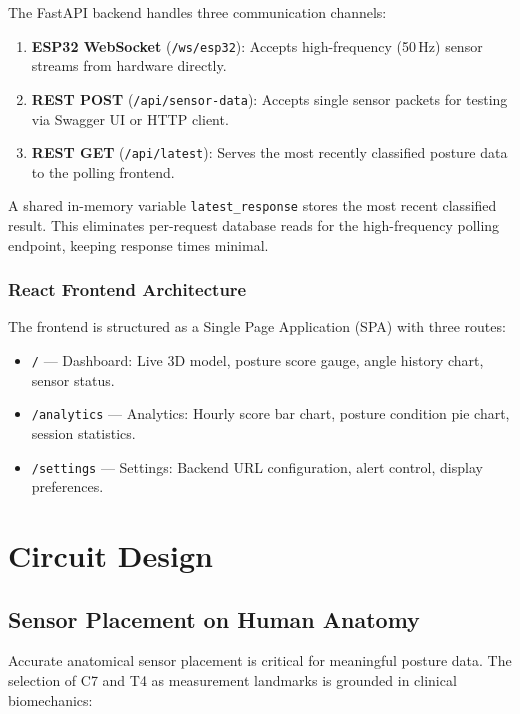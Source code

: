 \documentclass[12pt,a4paper]{report}
\newcommand{\code}[1]{\texttt{\small\color{accentviolet}#1}}
\begin{document}
The FastAPI backend handles three communication channels:
\begin{enumerate}[leftmargin=2em]
    \item \textbf{ESP32 WebSocket} (\code{/ws/esp32}): Accepts high-frequency (50\,Hz) sensor streams from hardware directly.
    \item \textbf{REST POST} (\code{/api/sensor-data}): Accepts single sensor packets for testing via Swagger UI or HTTP client.
    \item \textbf{REST GET} (\code{/api/latest}): Serves the most recently classified posture data to the polling frontend.
\end{enumerate}

A shared in-memory variable \code{latest\_response} stores the most recent classified result. This eliminates per-request database reads for the high-frequency polling endpoint, keeping response times minimal.

\subsection{React Frontend Architecture}

The frontend is structured as a Single Page Application (SPA) with three routes:
\begin{itemize}[leftmargin=2em]
    \item \code{/} — Dashboard: Live 3D model, posture score gauge, angle history chart, sensor status.
    \item \code{/analytics} — Analytics: Hourly score bar chart, posture condition pie chart, session statistics.
    \item \code{/settings} — Settings: Backend URL configuration, alert control, display preferences.
\end{itemize}


\chapter{Circuit Design}

\section{Sensor Placement on Human Anatomy}

Accurate anatomical sensor placement is critical for meaningful posture data. The selection of C7 and T4 as measurement landmarks is grounded in clinical biomechanics:
\end{document}

